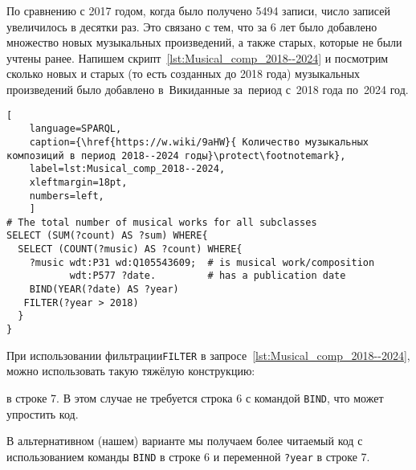По сравнению с 2017 годом, когда было получено \num{5494} записи, число записей увеличилось в десятки раз. Это связано с тем, что за 6 лет было добавлено множество новых музыкальных произведений, а также старых, которые не были учтены ранее.
Напишем скрипт~\ref{lst:Musical_comp_2018--2024} и посмотрим сколько новых и старых (то есть созданных до 2018 года) музыкальных произведений было добавлено в~Викиданные за~период с~2018 года по~2024 год.


\begin{lstlisting}[ 
    language=SPARQL,
    caption={\href{https://w.wiki/9aHW}{ Количество музыкальных композиций в период 2018--2024 годы}\protect\footnotemark},
    label=lst:Musical_comp_2018--2024,
    xleftmargin=18pt,
    numbers=left,
    ]
# The total number of musical works for all subclasses 
SELECT (SUM(?count) AS ?sum) WHERE{
  SELECT (COUNT(?music) AS ?count) WHERE{
    ?music wdt:P31 wd:Q105543609;  # is musical work/composition
           wdt:P577 ?date.         # has a publication date
    BIND(YEAR(?date) AS ?year)
   FILTER(?year > 2018)
  }
}
\end{lstlisting}%

При использовании фильтрации\lstinline|FILTER| в запросе~\ref{lst:Musical_comp_2018--2024}, можно использовать такую тяжёлую конструкцию:

 в строке 7.
В этом случае не требуется строка 6 с командой \lstinline|BIND|, что может упростить код.

В альтернативном (нашем) варианте мы получаем более читаемый код с использованием команды \lstinline|BIND| в строке 6 и переменной \lstinline|?year| в строке 7.

